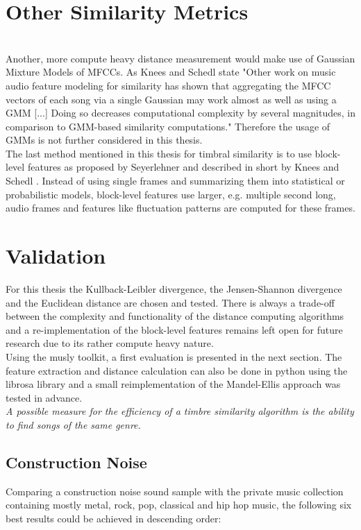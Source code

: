 \section{Other Similarity Metrics}
\ \\
Another, more compute heavy distance measurement would make use of Gaussian Mixture Models of MFCCs. As Knees and Schedl state "Other work on music audio feature modeling for similarity has shown that aggregating the MFCC vectors of each song via a single Gaussian may work almost as well as using a GMM [...] Doing so decreases computational complexity by several magnitudes, in comparison to GMM-based similarity computations." \cite[p. 65]{knees1} Therefore the usage of GMMs is not further considered in this thesis.
\ \\
The last method mentioned in this thesis for timbral similarity is to use block-level features as proposed by Seyerlehner \cite{seyerlehnerblock} and described in short by Knees and Schedl \cite[p. 67]{knees1}. 
Instead of using single frames and summarizing them into statistical or probabilistic models, block-level features use larger, e.g. multiple second long, audio frames and features like fluctuation patterns are computed for these frames. 

\section{Validation}

For this thesis the Kullback-Leibler divergence, the Jensen-Shannon divergence and the Euclidean distance are chosen and tested. There is always a trade-off between the complexity and functionality of the distance computing algorithms and a re-implementation of the block-level features remains left open for future research due to its rather compute heavy nature.\\
Using the musly toolkit, a first evaluation is presented in the next section. The feature extraction and distance calculation can also be done in python using the librosa library and a small reimplementation of the Mandel-Ellis approach was tested in advance.\\
\textit{A possible measure for the efficiency of a timbre similarity algorithm is the ability to find songs of the same genre.}

\subsection{Construction Noise}
Comparing a construction noise sound sample with the private music collection containing mostly metal, rock, pop, classical and hip hop music, the following six best results could be achieved in descending order: 

